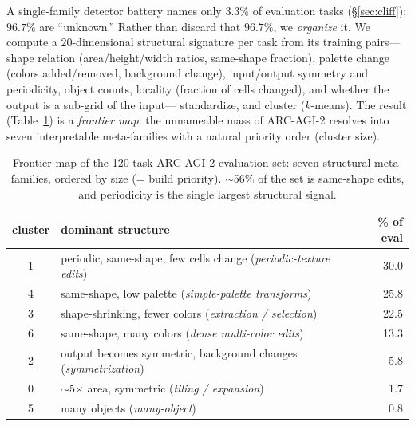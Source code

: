 A single-family detector battery names only $3.3\%$ of evaluation tasks (\S\ref{sec:cliff}); $96.7\%$ are
``unknown.'' Rather than discard that $96.7\%$, we \emph{organize} it. We compute a $20$-dimensional
structural signature per task from its training pairs---shape relation (area/height/width ratios, same-shape
fraction), palette change (colors added/removed, background change), input/output symmetry and periodicity,
object counts, locality (fraction of cells changed), and whether the output is a sub-grid of the input---
standardize, and cluster ($k$-means). The result (Table~\ref{tab:frontier}) is a \emph{frontier map}: the
unnameable mass of ARC-AGI-2 resolves into seven interpretable meta-families with a natural priority order
(cluster size).

\begin{table}[t]\centering
\caption{Frontier map of the 120-task ARC-AGI-2 evaluation set: seven structural meta-families, ordered by
size (= build priority). $\sim$56\% of the set is same-shape edits, and periodicity is the single largest
structural signal.}
\label{tab:frontier}
\small
\begin{tabular}{clr}
\toprule
cluster & dominant structure & \% of eval \\
\midrule
1 & periodic, same-shape, few cells change (\emph{periodic-texture edits}) & 30.0 \\
4 & same-shape, low palette (\emph{simple-palette transforms}) & 25.8 \\
3 & shape-shrinking, fewer colors (\emph{extraction / selection}) & 22.5 \\
6 & same-shape, many colors (\emph{dense multi-color edits}) & 13.3 \\
2 & output becomes symmetric, background changes (\emph{symmetrization}) & 5.8 \\
0 & $\sim$5$\times$ area, symmetric (\emph{tiling / expansion}) & 1.7 \\
5 & many objects (\emph{many-object}) & 0.8 \\
\bottomrule
\end{tabular}
\end{table}

